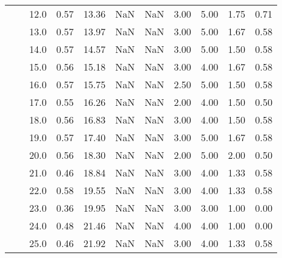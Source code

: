 \begin{tabular}{lllrrrrrrrr}
     &     & 12.0 &      0.57 &      13.36 &               NaN &                NaN & 3.00 &   5.00 &             1.75 &                         0.71 \\
     &     & 13.0 &      0.57 &      13.97 &               NaN &                NaN & 3.00 &   5.00 &             1.67 &                         0.58 \\
     &     & 14.0 &      0.57 &      14.57 &               NaN &                NaN & 3.00 &   5.00 &             1.50 &                         0.58 \\
     &     & 15.0 &      0.56 &      15.18 &               NaN &                NaN & 3.00 &   4.00 &             1.67 &                         0.58 \\
     &     & 16.0 &      0.57 &      15.75 &               NaN &                NaN & 2.50 &   5.00 &             1.50 &                         0.58 \\
     &     & 17.0 &      0.55 &      16.26 &               NaN &                NaN & 2.00 &   4.00 &             1.50 &                         0.50 \\
     &     & 18.0 &      0.56 &      16.83 &               NaN &                NaN & 3.00 &   4.00 &             1.50 &                         0.58 \\
     &     & 19.0 &      0.57 &      17.40 &               NaN &                NaN & 3.00 &   5.00 &             1.67 &                         0.58 \\
     &     & 20.0 &      0.56 &      18.30 &               NaN &                NaN & 2.00 &   5.00 &             2.00 &                         0.50 \\
     &     & 21.0 &      0.46 &      18.84 &               NaN &                NaN & 3.00 &   4.00 &             1.33 &                         0.58 \\
     &     & 22.0 &      0.58 &      19.55 &               NaN &                NaN & 3.00 &   4.00 &             1.33 &                         0.58 \\
     &     & 23.0 &      0.36 &      19.95 &               NaN &                NaN & 3.00 &   3.00 &             1.00 &                         0.00 \\
     &     & 24.0 &      0.48 &      21.46 &               NaN &                NaN & 4.00 &   4.00 &             1.00 &                         0.00 \\
     &     & 25.0 &      0.46 &      21.92 &               NaN &                NaN & 3.00 &   4.00 &             1.33 &                         0.58 \\

\end{tabular}
